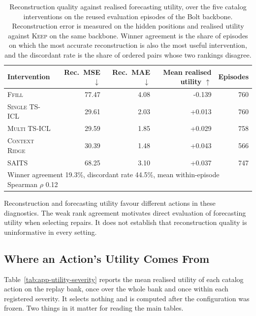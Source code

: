 \documentclass{article}
\begin{document}
\begin{table}[htbp]
  \caption{Reconstruction quality against realised forecasting utility, over the five catalog
  interventions on the reused evaluation episodes of the Bolt backbone. Reconstruction error is measured on the
  hidden positions and realised utility against \textsc{Keep} on the same backbone. Winner
  agreement is the share of episodes on which the most accurate reconstruction is also the most
  useful intervention, and the discordant rate is the share of ordered pairs whose two rankings
  disagree.}
  \label{tab:app-recutils}
  \centering
  \small
  \setlength{\tabcolsep}{4pt}
\begin{tabular*}{\textwidth}{@{\extracolsep{\fill}}lrrrr@{}}
    \toprule
    Intervention & Rec.\ MSE $\downarrow$ & Rec.\ MAE $\downarrow$
                 & Mean realised utility $\uparrow$ & Episodes \\
    \midrule
    \textsc{Ffill}         & 77.47  & 4.08  & -0.139  & 760 \\
    \textsc{Single TS-ICL} & 29.61 & 2.03 & +0.013 & 760 \\
    \textsc{Multi TS-ICL}  & 29.59  & 1.85  & +0.029  & 758 \\
    \textsc{Context Ridge} & 30.39  & 1.48  & +0.043  & 566 \\
    \textsc{SAITS}         & 68.25  & 3.10  & +0.037  & 747 \\
    \midrule
    \multicolumn{5}{l}{\footnotesize Winner agreement 19.3\%, discordant rate
    44.5\%, mean within-episode Spearman $\rho$ 0.12} \\
    \bottomrule
  \end{tabular*}
\end{table}

Reconstruction and forecasting utility favour different actions in these diagnostics.
The weak rank agreement motivates direct evaluation of forecasting utility when selecting
repairs. It does not establish that reconstruction quality is uninformative in every setting.

\subsection{Where an Action's Utility Comes From}
\label{app:utility-by-severity}
Table~\ref{tab:app-utility-severity} reports the mean realised utility of each catalog action
on the replay bank, once over the whole bank and once within each registered severity. It
selects nothing and is computed after the configuration was frozen. Two things in it matter for
reading the main tables.
\end{document}
